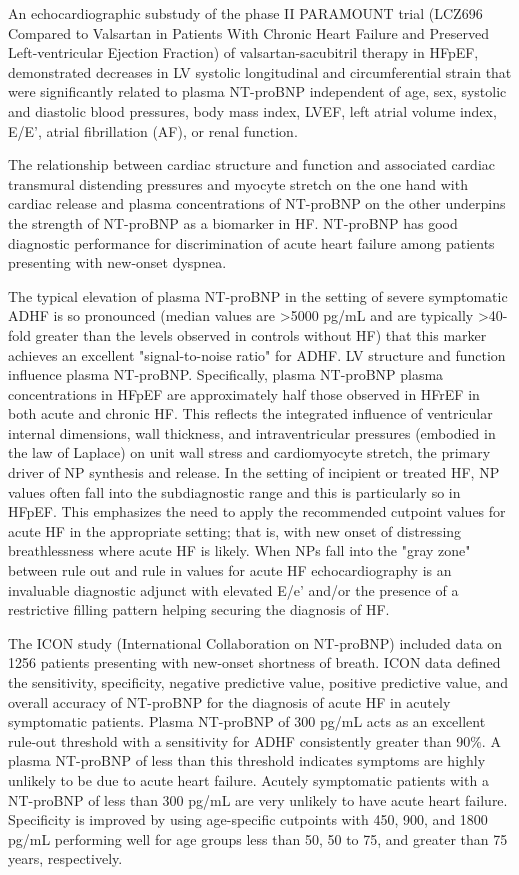\documentclass[14pt,a4paper,onecolumn]{extarticle}
\begin{document}
An echocardiographic substudy of the phase II PARAMOUNT trial (LCZ696 Compared to Valsartan in Patients With Chronic Heart Failure and Preserved Left-ventricular Ejection Fraction) of valsartan-sacubitril therapy in HFpEF, demonstrated decreases in LV systolic longitudinal and circumferential strain that were significantly related to plasma NT-proBNP independent of age, sex, systolic and diastolic blood pressures, body mass index, LVEF, left atrial volume index, E/E’, atrial fibrillation (AF), or renal function. \citep{Kraigher-Krainer2014}

The relationship between cardiac structure and function and associated cardiac transmural distending pressures and myocyte stretch on the one hand with cardiac release and plasma concentrations of NT-proBNP on the other underpins the strength of NT-proBNP as a biomarker in HF. NT-proBNP has good diagnostic performance for discrimination of acute heart failure among patients presenting with new-onset dyspnea. \citep{Richards2018}

The typical elevation of plasma NT-proBNP in the setting of severe symptomatic ADHF is so pronounced (median values are >5000 pg/mL and are typically >40-fold greater than the levels observed in controls without HF) that this marker achieves an excellent "signal-to-noise ratio" for ADHF. LV structure and function influence plasma NT-proBNP. Specifically, plasma NT-proBNP plasma concentrations in HFpEF are approximately half those observed in HFrEF in both acute and chronic HF. This reflects the integrated influence of ventricular internal dimensions, wall thickness, and intraventricular pressures (embodied in the law of Laplace) on unit wall stress and cardiomyocyte stretch, the primary driver of NP synthesis and release. In the setting of incipient or treated HF, NP values often fall into the subdiagnostic range and this is particularly so in HFpEF. This emphasizes the need to apply the recommended cutpoint values for acute HF in the appropriate setting; that is, with new onset of distressing breathlessness where acute HF is likely. When NPs fall into the "gray zone" between rule out and rule in values for acute HF echocardiography is an invaluable diagnostic adjunct with elevated E/e’ and/or the presence of a restrictive filling pattern helping securing the diagnosis of HF. \citep{Richards2018}

The ICON study (International Collaboration on NT-proBNP) included data on 1256 patients presenting with new-onset shortness of breath. ICON data defined the sensitivity, specificity, negative predictive value, positive predictive value, and overall accuracy of NT-proBNP for the diagnosis of acute HF in acutely symptomatic patients.  Plasma NT-proBNP of 300 pg/mL acts as an excellent rule-out threshold with a sensitivity for ADHF consistently greater than 90\%. A plasma NT-proBNP of less than this threshold indicates symptoms are highly unlikely to be due to acute heart failure. Acutely symptomatic patients with a NT-proBNP of less than 300 pg/mL are very unlikely to have acute heart failure. Specificity is improved by using age-specific cutpoints with 450, 900, and 1800 pg/mL performing well for age groups less than 50, 50 to 75, and greater than 75 years, respectively. \citep{Januzzi2006a}
\end{document}
